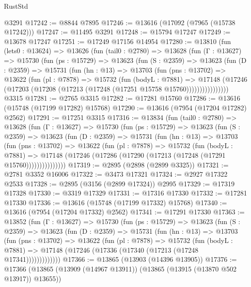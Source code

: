 \begin{lexlean}{RustStd}
\begin{coremodule}
    @3291
@17242 := @8844 @7895
@17246 := @13616 (@17092 (@7965 (@15738 @17242)))
@17247 := @11495 @3291
@17248 := @15794 @17247
@17249 := @13678 @17247
@17251 := @17249 @17156 @14954
@17280 := @13810
    (fun (lets0 : @13624) =>
    @13626
      (fun (tail0 : @2780) =>
      @13628
        (fun (Γ : @13627) =>
        @15730
          (fun (ps : @15729) =>
          @13623
            (fun (S : @2359) =>
            @13623
              (fun (D : @2359) =>
              @15731
                (fun (hn : @13) =>
                @13703
                  (fun (pns : @13702) =>
                  @13622
                    (fun (pl : @7878) =>
                    @15732
                      (fun (bodyL : @7881) =>
                      @17148
                        (@17246
                          (@17203 (@17208 (@17213 (@17248 (@17251 @15758 @15760))))))))))))))))
    @3315
@17281 := @2765 @3315
@17282 := @17281 @15760
@17286 := @13616 (@15748 (@17199 @17282) @15768)
@17290 := @13616 (@7954 (@17204 @17282) @2562)
@17291 := @17251 @3315
@17316 := @13834
    (fun (tail0 : @2780) =>
    @13628
      (fun (Γ : @13627) =>
      @15730
        (fun (ps : @15729) =>
        @13623
          (fun (S : @2359) =>
          @13623
            (fun (D : @2359) =>
            @15731
              (fun (hn : @13) =>
              @13703
                (fun (pns : @13702) =>
                @13622
                  (fun (pl : @7878) =>
                  @15732
                    (fun (bodyL : @7881) =>
                    @17148 (@17246 (@17286 (@17290 (@17213 (@17248 (@17291 @15760)))))))))))))))
@17319 := @2895 (@2898 (@2899 @3325))
@17321 := @2781 @3352 @16006
@17322 := @3473 @17321
@17324 := @2927 @17322 @2533
@17328 := @2895 (@3156 (@2899 @17324)) @2995
@17329 := @17319 @17328
@17330 := @3319 @17329
@17331 := @17316 @17330
@17332 := @17281 @17330
@17336 := @13616 (@15748 (@17199 @17332) @15768)
@17340 := @13616 (@7954 (@17204 @17332) @2562)
@17341 := @17291 @17330
@17363 := @13852
    (fun (Γ : @13627) =>
    @15730
      (fun (ps : @15729) =>
      @13623
        (fun (S : @2359) =>
        @13623
          (fun (D : @2359) =>
          @15731
            (fun (hn : @13) =>
            @13703
              (fun (pns : @13702) =>
              @13622
                (fun (pl : @7878) =>
                @15732
                  (fun (bodyL : @7881) =>
                  @17148 (@17246 (@17336 (@17340 (@17213 (@17248 @17341)))))))))))))
@17366 := @13865 (@13903 (@14396 @13905))
@17376 := @17366 (@13865 (@13909 (@14967 @13911)) (@13865 (@13915 (@13870 @502 @13917)) @13655))

\end{coremodule}
\end{lexlean}
